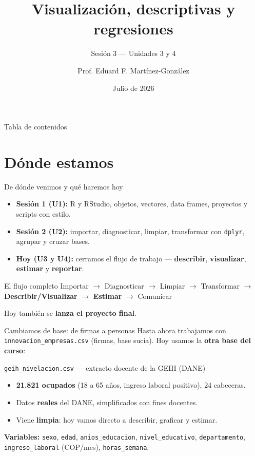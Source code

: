\documentclass[10pt]{beamer}
\title[Sesión 3]{Visualización, descriptivas y regresiones}
\subtitle{Sesión 3 --- Unidades 3 y 4}
\author{Prof. Eduard F. Martínez-González}
\institute[CIENFI · Icesi]{Curso Nivelatorio de Programación en R\\ CIENFI --- Universidad Icesi}
\date{Julio de 2026}
\begin{document}
\frame{\titlepage}

\begin{frame}{Tabla de contenidos}
  \tableofcontents
\end{frame}

\section{Dónde estamos}

\begin{frame}{De dónde venimos y qué haremos hoy}
  \begin{itemize}\setlength\itemsep{0.6em}
    \item \textbf{Sesión 1 (U1):} R y RStudio, objetos, vectores, data frames, proyectos y scripts con estilo.
    \item \textbf{Sesión 2 (U2):} importar, diagnosticar, limpiar, transformar con \texttt{dplyr}, agrupar y cruzar bases.
    \item \textbf{Hoy (U3 y U4):} cerramos el flujo de trabajo --- \textbf{describir}, \textbf{visualizar}, \textbf{estimar} y \textbf{reportar}.
  \end{itemize}
  \bigskip
  \begin{block}{El flujo completo}
    \centering
    Importar $\rightarrow$ Diagnosticar $\rightarrow$ Limpiar $\rightarrow$ Transformar $\rightarrow$ \textbf{Describir/Visualizar} $\rightarrow$ \textbf{Estimar} $\rightarrow$ Comunicar
  \end{block}
  \medskip
  Hoy también se \textbf{lanza el proyecto final}.
\end{frame}

\begin{frame}{Cambiamos de base: de firmas a personas}
  Hasta ahora trabajamos con \texttt{innovacion\_empresas.csv} (firmas, base sucia).
  Hoy usamos la \textbf{otra base del curso}:
  \bigskip
  \begin{block}{\texttt{geih\_nivelacion.csv} --- extracto docente de la GEIH (DANE)}
    \begin{itemize}
      \item \textbf{21.821 ocupados} (18 a 65 años, ingreso laboral positivo), 24 cabeceras.
      \item Datos \textbf{reales} del DANE, simplificados con fines docentes.
      \item Viene \textbf{limpia}: hoy vamos directo a describir, graficar y estimar.
    \end{itemize}
  \end{block}
  \medskip
  \small\textbf{Variables:} \texttt{sexo}, \texttt{edad}, \texttt{anios\_educacion}, \texttt{nivel\_educativo}, \texttt{departamento}, \texttt{ingreso\_laboral} (COP/mes), \texttt{horas\_semana}.
\end{frame}
\end{document}
